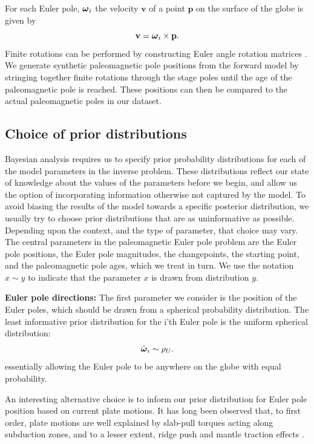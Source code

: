 \documentclass[11pt,letterpaper]{article}
\newcommand{\mitbf}[1]{\hbox{\mathversion{bold}$#1$}}
\begin{document}
For each Euler pole, $\mitbf{\omega}_i$ the velocity $\mathbf{v}$ of a point $\mathbf{p}$ on the surface of the globe is given by
\begin{equation}
\mathbf{v} = \mitbf{\omega}_i \times \mathbf{p}.
\label{eq:rigid_rotation}
\end{equation}
Finite rotations can be performed by constructing Euler angle rotation matrices \citep[cf.][]{Goldstein1965a}.  We generate synthetic paleomagnetic pole positions from the forward model by stringing together finite rotations through the stage poles until the age of the paleomagnetic pole is reached. These positions can then be compared to the actual paleomagnetic poles in our dataset.

\subsection*{Choice of prior distributions}
\label{sec:priors}

Bayesian analysis requires us to specify prior probability distributions for each of the model parameters in the inverse problem. These distributions reflect our state of knowledge about the values of the parameters before we begin, and allow us the option of incorporating information otherwise not captured by the model. To avoid biasing the results of the model towards a specific posterior distribution, we usually try to choose prior distributions that are as uninformative as possible. Depending upon the context, and the type of parameter, that choice may vary. The central parameters in the paleomagnetic Euler pole problem are the Euler pole positions, the Euler pole magnitudes, the changepoints, the starting point, and the paleomagnetic pole ages, which we treat in turn. We use the notation $x \sim y$ to indicate that the parameter $x$ is drawn from distribution $y$.

\textbf{Euler pole directions:} 
The first parameter we consider is the position of the Euler poles, which should be drawn from a spherical probability distribution. The least informative prior distribution for the i'th Euler pole is the uniform spherical distribution:
\begin{equation}
\hat{\mitbf{\omega}}_i \sim \rho_U.
\end{equation}
essentially allowing the Euler pole to be anywhere on the globe with equal probability.

An interesting alternative choice is to inform our prior distribution for Euler pole position based on current plate motions. It has long been observed that, to first order, plate motions are well explained by slab-pull torques acting along subduction zones, and to a lesser extent, ridge push and mantle traction effects \citep{Forsyth1975a, Gordon1978a, Richardson1992a}. 
\end{document}
